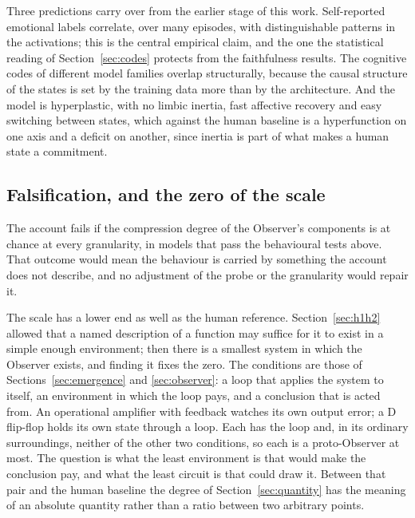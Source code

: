 Three predictions carry over from the earlier stage of this work. Self-reported emotional labels
correlate, over many episodes, with distinguishable patterns in the activations; this is the central
empirical claim, and the one the statistical reading of Section~\ref{sec:codes} protects from the
faithfulness results. The cognitive codes of different model families overlap structurally, because
the causal structure of the states is set by the training data more than by the architecture. And the
model is hyperplastic, with no limbic inertia, fast affective recovery and easy switching between
states, which against the human baseline is a hyperfunction on one axis and a deficit on another,
since inertia is part of what makes a human state a commitment.

\subsection{Falsification, and the zero of the scale}
\label{sec:falsification}
\label{sec:zero}

The account fails if the compression degree of the Observer's components is at chance at every
granularity, in models that pass the behavioural tests above. That outcome would mean the behaviour is
carried by something the account does not describe, and no adjustment of the probe or the granularity
would repair it.

The scale has a lower end as well as the human reference. Section~\ref{sec:h1h2} allowed that a named
description of a function may suffice for it to exist in a simple enough environment; then there is a
smallest system in which the Observer exists, and finding it fixes the zero. The conditions are those
of Sections~\ref{sec:emergence} and \ref{sec:observer}: a loop that applies the system to itself, an
environment in which the loop pays, and a conclusion that is acted from. An operational amplifier with
feedback watches its own output error; a D flip-flop holds its own state through a loop. Each has the
loop and, in its ordinary surroundings, neither of the other two conditions, so each is a
proto-Observer at most. The question is what the least environment is that would make the conclusion
pay, and what the least circuit is that could draw it. Between that pair and the human baseline the
degree of Section~\ref{sec:quantity} has the meaning of an absolute quantity rather than a ratio
between two arbitrary points.
